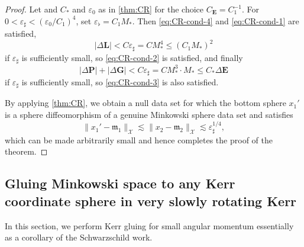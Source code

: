 \documentclass[10pt]{article}
\numberwithin{equation}{section}
\theoremstyle{plain}
\newtheorem*{thmB}{Theorem B}
\theoremstyle{definition}
\renewcommand{\Bbb}{\mathbb}
\newcommand{\ve}{\varepsilon}
\newcommand{\les}{\lesssim}
\begin{document}
\begin{proof}
Let and $C_*$ and $\ve_0$ as in \cref{thm:CR} for the choice $C_\mathbf E=C_1^{-1}$. For $0<\ve_\sharp <(\ve_0/C_1)^4$, set $\ve_\flat = C_1M_*$. Then \eqref{eq:CR-cond-4} and \eqref{eq:CR-cond-1} are satisfied,
\begin{equation*}
    |\Delta \mathbf L| < C\ve_\sharp = CM_*^4 \le (C_1M_*)^2  
\end{equation*}
if $\ve_\sharp$ is sufficiently small, so \eqref{eq:CR-cond-2} is satisfied, and finally 
\begin{equation}
    |\Delta\mathbf P|+|\Delta \mathbf G| < C\ve_\sharp =   CM_*^3 \cdot M_* \le C_*\Delta\mathbf E
\end{equation}
if $\ve_\sharp$ is sufficiently small, so \eqref{eq:CR-cond-3} is also satisfied.

 By applying \cref{thm:CR}, we obtain a null data set for which the bottom sphere $x_1'$ is a sphere diffeomorphism of a genuine Minkowski sphere data set and satisfies 
 \begin{equation}
     \|x_1'-\mathfrak m_1\|_{\mathcal X} \les \|x_2-\mathfrak m_2\|_{\mathcal X}\les \ve_\sharp^{1/4},
 \end{equation}
 which can be made arbitrarily small and hence completes the proof of the theorem. 
\end{proof}



\subsection{Gluing Minkowski space to any Kerr coordinate sphere in very slowly rotating Kerr}
\label{sec:thmB}

In this section, we perform Kerr gluing for small angular momentum essentially as a corollary of the Schwarzschild work. 

\end{document}
